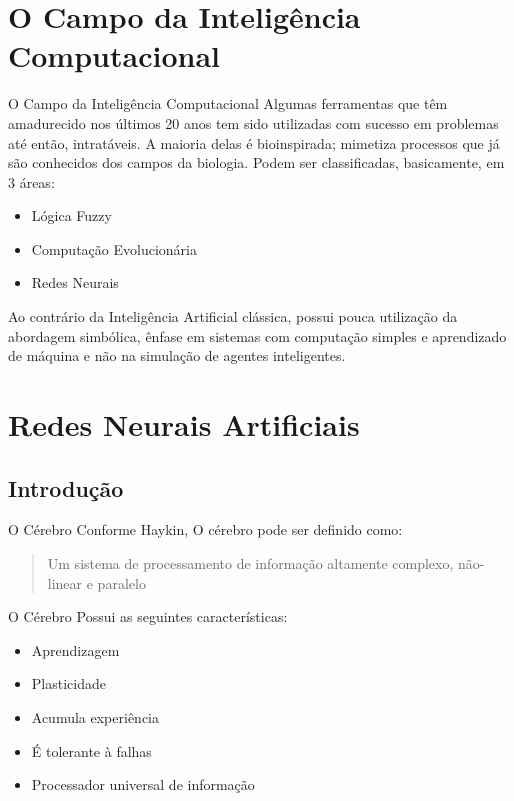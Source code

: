 \documentclass{beamer}
\begin{document}
  \section{O Campo da Inteligência Computacional}
    \frame{\sectionpage}
      \begin{frame}{O Campo da Inteligência Computacional} 
	Algumas ferramentas que têm amadurecido nos últimos 20 anos tem sido utilizadas com sucesso em problemas até então, intratáveis. A maioria delas é bioinspirada; mimetiza processos que já são conhecidos dos campos da biologia. Podem ser classificadas, basicamente, em 3 áreas:

	\begin{itemize}
	  \item Lógica Fuzzy
	  \item Computação Evolucionária
	  \item Redes Neurais
	\end{itemize}
	Ao contrário da Inteligência Artificial clássica, possui pouca utilização da abordagem simbólica, ênfase em sistemas com computação simples e aprendizado de máquina e não na simulação de agentes inteligentes.
    \end{frame}
  \section{Redes Neurais Artificiais}
    \frame{\sectionpage}
    \subsection{Introdução}
      \begin{frame}{O Cérebro}
	Conforme Haykin, O cérebro pode ser definido como:
	  \begin{quote}
	    Um sistema de processamento de informação altamente complexo, não-linear e paralelo
	  \end{quote}
      \end{frame}
      
      \begin{frame}{O Cérebro}
	Possui as seguintes características:
	\begin{itemize}
	  \item Aprendizagem
	  \item Plasticidade
	  \item Acumula experiência
	  \item É tolerante à falhas
	  \item Processador universal de informação
	\end{itemize} 
      \end{frame}
      
\end{document}
